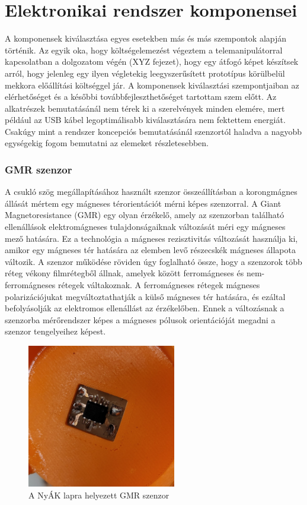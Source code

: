 \section{Elektronikai rendszer komponensei}

A komponensek kiválasztása egyes esetekben más és más szempontok alapján történik. Az egyik oka, hogy költségelemezést végeztem a telemanipulátorral kapcsolatban a dolgozatom végén (XYZ fejezet), hogy egy átfogó képet készítsek arról, hogy jelenleg egy ilyen végletekig leegyszerűsített prototípus körülbelül mekkora előállítási költséggel jár. A komponensek kiválasztási szempontjaiban az elérhetőséget és a későbbi továbbfejleszthetőséget tartottam szem előtt. Az alkatrészek bemutatásánál nem térek ki a szerelvények minden elemére, mert például az USB kábel legoptimálisabb kiválasztására nem fektettem energiát. Csakúgy mint a rendszer koncepciós bemutatásánál szenzortól haladva a nagyobb egységekig fogom bemutatni az elemeket részletesebben.

\subsubsection{GMR szenzor}
\label{sec:gmr_leiras}

A csukló szög megállapításához használt szenzor összeállításban a korongmágnes állását mértem egy mágneses térorientációt mérni képes szenzorral. A Giant Magnetoresistance (GMR) egy olyan érzékelő, amely az szenzorban található ellenállások elektromágneses tulajdonságaiknak változását méri egy mágneses mező hatására. Ez a technológia a mágneses rezisztivitás változását használja ki, amikor egy mágneses tér hatására az elemben levő részecskék mágneses állapota változik. A szenzor működése röviden úgy foglalható össze, hogy a szenzorok több réteg vékony filmrétegből állnak, amelyek között ferromágneses és nem-ferromágneses rétegek váltakoznak. A ferromágneses rétegek mágneses polarizációjukat megváltoztathatják a külső mágneses tér hatására, és ezáltal befolyásolják az elektromos ellenállást az érzékelőben. Ennek a változásnak a szenzorba mérőrendszer képes a mágneses pólusok orientációját megadni a szenzor tengelyeihez képest.

\begin{figure}[!ht]
\centering
\includegraphics[width=65mm, keepaspectratio]{figures/Csuklo_szog_teszt/szenzor}
\caption{A NyÁK lapra helyezett GMR szenzor}
\label{fig:csuklo_szenzor_pcb}
\end{figure}

